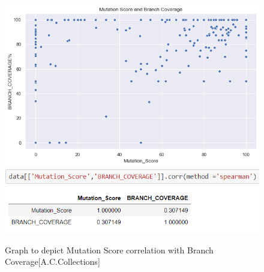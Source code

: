 \documentclass[letterpaper, 12 pt, conference]{ieeetran}  %
\begin{document}
\begin{figure}[H]
   \includegraphics[scale=0.45]{metric3 vs 2 commons-collections.png}%
   \\ \includegraphics[scale=0.70]{metric3 vs 2 commons-collections_spearmanr.png} %
    \caption{Graph to depict Mutation Score correlation with Branch Coverage{\footnotesize[A.C.Collections]}}
 \end{figure}
\smallskip
\end{document}

